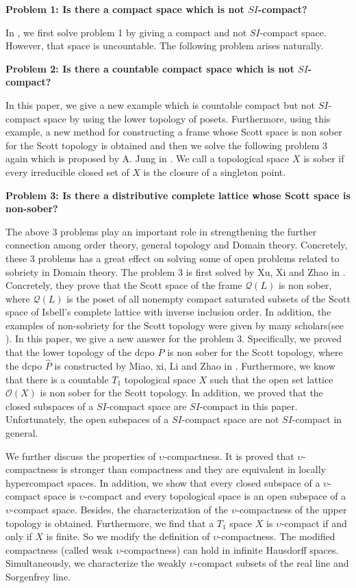 \documentclass[preprint,12pt]{elsarticle}
\numberwithin{equation}{section}
\begin{document}
{\bf Problem 1:  Is there a compact space which is not $SI$-compact?}

In \cite{BZ35}, we first solve problem 1 by giving a compact and not $SI$-compact space. However, that space is uncountable. The following problem arises naturally.

{\bf Problem 2:  Is there a countable compact space which is not $SI$-compact?}

 In this paper, we give a new example which is countable compact but not $SI$-compact space by using the lower topology of posets. Furthermore, using this example, a new method for constructing a frame whose Scott space is non sober for the Scott topology is obtained and then we solve the following problem 3 again which is proposed by A. Jung in \cite{RTT45}. We call a topological space $X$ is sober if every irreducible closed set of $X$ is the closure of a singleton point.

{\bf Problem 3:  Is there a distributive complete lattice whose Scott space is non-sober?}

The above 3 problems play an important role in strengthening the further connection among order theory, general topology and Domain theory. Concretely, these 3 problems has a great effect on solving some of open problems related to sobriety in Domain theory. The problem 3 is first solved by Xu, Xi and Zhao in \cite{HZ16}. Concretely, they prove that the Scott space of the frame $\mathcal{Q}(L)$ is non sober, where $\mathcal{Q}(L)$ is the poset of all nonempty compact saturated subsets of the Scott space of Isbell's complete lattice with inverse inclusion order. In addition, the examples of non-sobriety for the Scott topology were given by many scholars(see \cite{SOJ81,WSMJ81,GOUY03,HZT96,DFG15}). In this paper, we give a new answer for the problem 3. Specifically, we proved that the lower topology of the dcpo $\widehat{P}$ is non sober for the Scott topology, where the dcpo $\widehat{P}$ is constructed by Miao, xi, Li and Zhao in \cite{AB75}. Furthermore, we know that there is a countable $T_{1}$ topological space $X$ such that the open set lattice $\mathcal{O}(X)$ is non sober for the Scott topology. In addition, we proved that the closed subspaces of a $SI$-compact space are $SI$-compact in this paper. Unfortunately, the open subspaces of a $SI$-compact space are not $SI$-compact in general.

\quad  We further discuss the properties of $\upsilon$-compactness. It is proved that $\upsilon$-compactness is stronger than compactness and they are equivalent in locally hypercompact spaces. In addition, we show that every closed subspace of a $\upsilon$-compact space is $\upsilon$-compact and every topological space is an open subspace of a $\upsilon$-compact space. Besides, the characterization of the $\upsilon$-compactness of the upper topology is obtained.  Furthermore, we find that a $T_{1}$ space $X$ is $\upsilon$-compact if and only if $X$ is finite. So we modify the definition of $\upsilon$-compactness. The modified compactness (called weak $\upsilon$-compactness) can hold in infinite Hausdorff spaces. Simultaneously, we characterize the weakly $\upsilon$-compact subsets of the real line and Sorgenfrey line.
\end{document}
